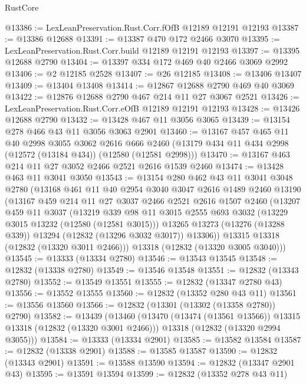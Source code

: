 \begin{lexlean}{RustCore}
\begin{coremodule}
@13386 := LexLeanPreservation.Rust.Corr.fOfB @12189 @12191 @12193
@13387 := @13386 @12688
@13391 := @13387 @470 @172 @2466 @3070
@13395 := LexLeanPreservation.Rust.Corr.build @12189 @12191 @12193
@13397 := @13395 @12688 @2790
@13404 := @13397 @334 @172 @469 @40 @2466 @3069 @2992
@13406 := @2 @12185 @2528
@13407 := @26 @12185
@13408 := @13406 @13407
@13409 := @13404 @13408
@13414 := @12867 @12688 @2790 @469 @40 @3069
@13422 := @12876 @12688 @2790 @467 @214 @11 @27 @3067 @2521
@13426 := LexLeanPreservation.Rust.Corr.eOfB @12189 @12191 @12193
@13428 := @13426 @12688 @2790
@13432 := @13428 @467 @11 @3056 @3065
@13439 := @13154 @278 @466 @43 @11 @3056 @3063 @2901
@13460 := @13167
    @457
    @465
    @11
    @40
    @2998
    @3055
    @3062
    @2616
    @666
    @2460
    (@13179 @434 @11 @434 @2998 (@12572 (@13184 @434)) (@12580 (@12581 @2998)))
@13470 := @13167 @463 @214 @11 @27 @3052 @2466 @2521 @2616 @1539 @2460
@13474 := @13428 @463 @11 @3041 @3050
@13543 := @13154
    @280
    @462
    @43
    @11
    @3041
    @3048
    @2780
    (@13168
      @461
      @11
      @40
      @2954
      @3040
      @3047
      @2616
      @1489
      @2460
      @13190
      (@13167
        @459
        @214
        @11
        @27
        @3037
        @2466
        @2521
        @2616
        @1507
        @2460
        (@13207
          @459
          @11
          @3037
          (@13219
            @339
            @98
            @11
            @3015
            @2555
            @693
            @3032
            (@13229 @3015 @13232 (@12580 (@12581 @3015)))
            @13265
            @13273
            (@13276 (@13288 @339))
            @13294
            (@12832 (@13296 @3032 @3017))
            @13306))
        @13315
        @13318
        (@12832 (@13320 @3011 @2466)))
      @13318
      (@12832 (@13320 @3005 @3040)))
@13545 := @13333 (@13334 @2780)
@13546 := @13543 @13545
@13548 := @12832 (@13338 @2780)
@13549 := @13546 @13548
@13551 := @12832 (@13343 @2780)
@13552 := @13549 @13551
@13555 := @12832 (@13347 @2780 @43)
@13556 := @13552 @13555
@13560 := @12832 (@13352 @280 @43 @11)
@13561 := @13556 @13560
@13566 := @12832 (@13301 (@13302 (@13358 @2780)) @2790)
@13582 := @13439
    (@13460
      (@13470 (@13474 (@13561 @13566)) @13315 @13318 (@12832 (@13320 @3001 @2466)))
      @13318
      (@12832 (@13320 @2994 @3055)))
@13584 := @13333 (@13334 @2901)
@13585 := @13582 @13584
@13587 := @12832 (@13338 @2901)
@13588 := @13585 @13587
@13590 := @12832 (@13343 @2901)
@13591 := @13588 @13590
@13594 := @12832 (@13347 @2901 @43)
@13595 := @13591 @13594
@13599 := @12832 (@13352 @278 @43 @11)

\end{coremodule}
\end{lexlean}
